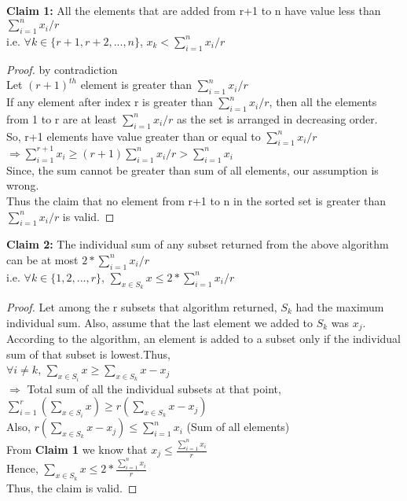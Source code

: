 \documentclass[11pt]{article}
\begin{document}
\begin{enumerate}
    \textbf{Claim 1:} All the elements that are added from r+1 to n have value less than $\sum_{i=1}^n x_i/r$\\
    i.e. $\forall k \in \{r+1,r+2,...,n\}$, $ x_k < \sum_{i=1}^n x_i/r$
    \begin{proof} by contradiction \\
    Let $(r+1)^{th}$ element is greater than $\sum_{i=1}^n x_i/r$\\
    If any element after index r is greater than $\sum_{i=1}^n x_i/r$, then all the elements from 1 to r are at least $\sum_{i=1}^n x_i/r$ as the set is arranged in decreasing order.\\
    So, r+1 elements have value greater than or equal to $\sum_{i=1}^n x_i/r$\\
    $\Longrightarrow \sum_{i=1}^{r+1} x_i \geq (r+1)\sum_{i=1}^n x_i/r > \sum_{i=1}^n x_i$ \\
    Since, the sum cannot be greater than sum of all elements, our assumption is wrong.\\
    Thus the claim that no element from r+1 to n in the sorted set is greater than $\sum_{i=1}^n x_i/r$ is valid.
    \end{proof}
    \textbf{Claim 2:} The individual sum of any subset returned from the above algorithm can be at most $2* \sum_{i=1}^n x_i/r$ \\ 
    i.e. $\forall k \in \{1,2,...,r\}$, $\sum_{x \in S_k} x \leq 2* \sum_{i=1}^n x_i/r$
    \begin{proof}
     Let among the r subsets that algorithm returned, $S_k$ had the maximum individual sum. Also, assume that the last element we added to $S_k$ was $x_j$.\\
     According to the algorithm, an element is added to a subset only if the individual sum of that subset is lowest.Thus, \\
     $\forall {i \neq k}$, $\sum_{x \in S_i} x \geq \sum_{x \in S_k} x - x_j$ \\
     $\Longrightarrow$ Total sum of all the individual subsets at that point, $\sum_{i=1}^r (\sum_{x \in S_i} x) \geq r(\sum_{x \in S_k} x - x_j)$ \\
     Also, $r(\sum_{x \in S_k} x - x_j) \leq \sum_{i=1}^n x_i$ (Sum of all elements)\\
     From \textbf{Claim 1} we know that $x_j \leq \frac{\sum_{i=1}^n x_i}{r}$ \\
     Hence, $\sum_{x \in S_k} x \leq 2*\frac{\sum_{i=1}^n x_i}{r}$ \\
     Thus, the claim is valid.

\end{proof}
\end{enumerate}
\end{document}
